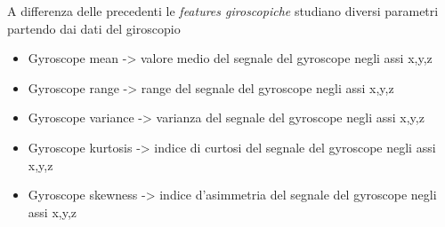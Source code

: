 A differenza delle precedenti le {\itshape features giroscopiche} studiano diversi parametri partendo dai dati del giroscopio
\begin{itemize}
    \item Gyroscope mean -> valore medio del segnale del gyroscope negli assi x,y,z
    \item Gyroscope range -> range del segnale del gyroscope negli assi x,y,z
    \item Gyroscope variance -> varianza del segnale del gyroscope negli assi x,y,z
    \item Gyroscope kurtosis -> indice di curtosi del segnale del gyroscope negli assi x,y,z
    \item Gyroscope skewness -> indice d'asimmetria del segnale del gyroscope negli assi x,y,z
\end{itemize}